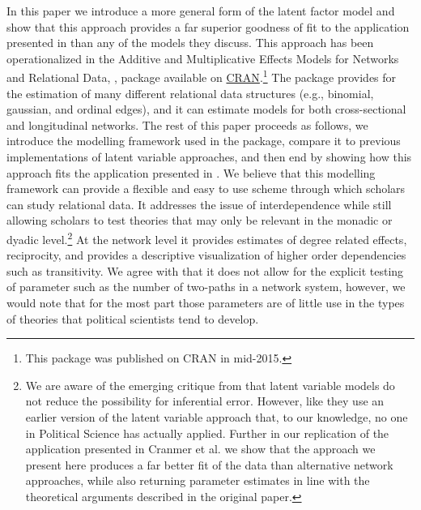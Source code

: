 In this paper we introduce a more general form of the latent factor model and show that this approach provides a far superior goodness of fit to the application presented in \citet{cranmer:etal:2016} than any of the models they discuss. This approach has been operationalized in the Additive and Multiplicative Effects Models for Networks and Relational Data, , package available on \href{https://cran.r-project.org/web/packages/amen/index.html}{CRAN}.\footnote{This package was published on CRAN in mid-2015.} The  package provides for the estimation of many different relational data structures (e.g., binomial, gaussian, and ordinal edges), and it can estimate models for both cross-sectional and longitudinal networks. The rest of this paper proceeds as follows, we introduce the modelling framework used in the  package, compare it to previous implementations of latent variable approaches, and then end by showing how this approach fits the application presented in \citet{cranmer:etal:2016}. We believe that this modelling framework can provide a flexible and easy to use scheme through which scholars can study relational data. It addresses the issue of interdependence while still allowing scholars to test theories that may only be relevant in the monadic or dyadic level.\footnote{We are aware of the emerging critique from \citet{jones:etal:2016} that latent variable models do not reduce the possibility for inferential error. However, like \citet{cranmer:etal:2016} they use an earlier version of the latent variable approach that, to our knowledge, no one in Political Science has actually applied. Further in our replication of the application presented in Cranmer et al. we show that the approach we present here produces a far better fit of the data than alternative network approaches, while also returning parameter estimates in line with the theoretical arguments described in the original paper.} At the network level it provides estimates of degree related effects, reciprocity, and provides a descriptive visualization of higher order dependencies such as transitivity. We agree with \citet{cranmer:etal:2016} that it does not allow for the explicit testing of parameter such as the number of two-paths in a network system, however, we would note that for the most part those parameters are of little use in the types of theories that political scientists tend to develop. 


